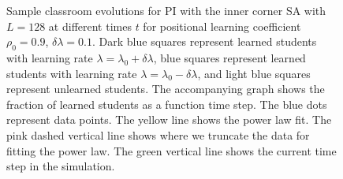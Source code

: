 \begin{figure}[htbp!]
   \caption{Sample classroom evolutions for PI with the inner corner SA with $L=128$ at different times $t$ for positional learning coefficient $\rho_0=0.9$, $\delta\lambda = 0.1$.
   Dark blue squares represent learned students with learning rate $\lambda = \lambda_0 + \delta\lambda$, blue squares represent learned students with learning rate $\lambda = \lambda_0 - \delta\lambda$, and light blue squares represent unlearned students.
   The accompanying graph shows the fraction of learned students as a function time step.
   The blue dots represent data points. 
   The yellow line shows the power law fit.
   The pink dashed vertical line shows where we truncate the data for fitting the power law.
   The green vertical line shows the current time step in the simulation.
   }
   \label{fig:2DBPCAIH sample class evolution high rho}
\end{figure}

